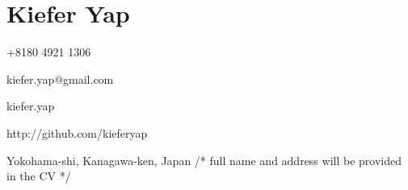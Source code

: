 \section*{\hfill Kiefer Yap \hfill}

\speciallinebreak
\begin{description}
	\begin{multicols}{2}
	\item[\faPhone] +8180 4921 1306
    \item[\faEnvelope] kiefer.yap@gmail.com
    \item[\faSkype] kiefer.yap
    \item[\faGit] http://github.com/kieferyap
	\end{multicols}
    \item[\faHome] Yokohama-shi, Kanagawa-ken, Japan {\small{\color{gray}/* full name and address will be provided in the CV */ }}
\end{description}